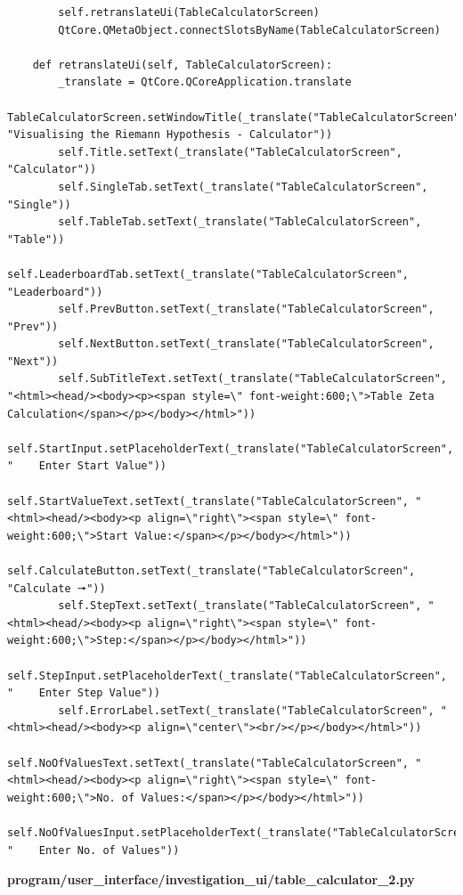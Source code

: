 \documentclass{article}
\begin{document}
\begin{lstlisting}
        self.retranslateUi(TableCalculatorScreen)
        QtCore.QMetaObject.connectSlotsByName(TableCalculatorScreen)

    def retranslateUi(self, TableCalculatorScreen):
        _translate = QtCore.QCoreApplication.translate
        TableCalculatorScreen.setWindowTitle(_translate("TableCalculatorScreen", "Visualising the Riemann Hypothesis - Calculator"))
        self.Title.setText(_translate("TableCalculatorScreen", "Calculator"))
        self.SingleTab.setText(_translate("TableCalculatorScreen", "Single"))
        self.TableTab.setText(_translate("TableCalculatorScreen", "Table"))
        self.LeaderboardTab.setText(_translate("TableCalculatorScreen", "Leaderboard"))
        self.PrevButton.setText(_translate("TableCalculatorScreen", "Prev"))
        self.NextButton.setText(_translate("TableCalculatorScreen", "Next"))
        self.SubTitleText.setText(_translate("TableCalculatorScreen", "<html><head/><body><p><span style=\" font-weight:600;\">Table Zeta Calculation</span></p></body></html>"))
        self.StartInput.setPlaceholderText(_translate("TableCalculatorScreen", "    Enter Start Value"))
        self.StartValueText.setText(_translate("TableCalculatorScreen", "<html><head/><body><p align=\"right\"><span style=\" font-weight:600;\">Start Value:</span></p></body></html>"))
        self.CalculateButton.setText(_translate("TableCalculatorScreen", "Calculate 🠖"))
        self.StepText.setText(_translate("TableCalculatorScreen", "<html><head/><body><p align=\"right\"><span style=\" font-weight:600;\">Step:</span></p></body></html>"))
        self.StepInput.setPlaceholderText(_translate("TableCalculatorScreen", "    Enter Step Value"))
        self.ErrorLabel.setText(_translate("TableCalculatorScreen", "<html><head/><body><p align=\"center\"><br/></p></body></html>"))
        self.NoOfValuesText.setText(_translate("TableCalculatorScreen", "<html><head/><body><p align=\"right\"><span style=\" font-weight:600;\">No. of Values:</span></p></body></html>"))
        self.NoOfValuesInput.setPlaceholderText(_translate("TableCalculatorScreen", "    Enter No. of Values"))
\end{lstlisting}


\textbf{program/user\_interface/investigation\_ui/table\_calculator\_2.py}
\end{document}
